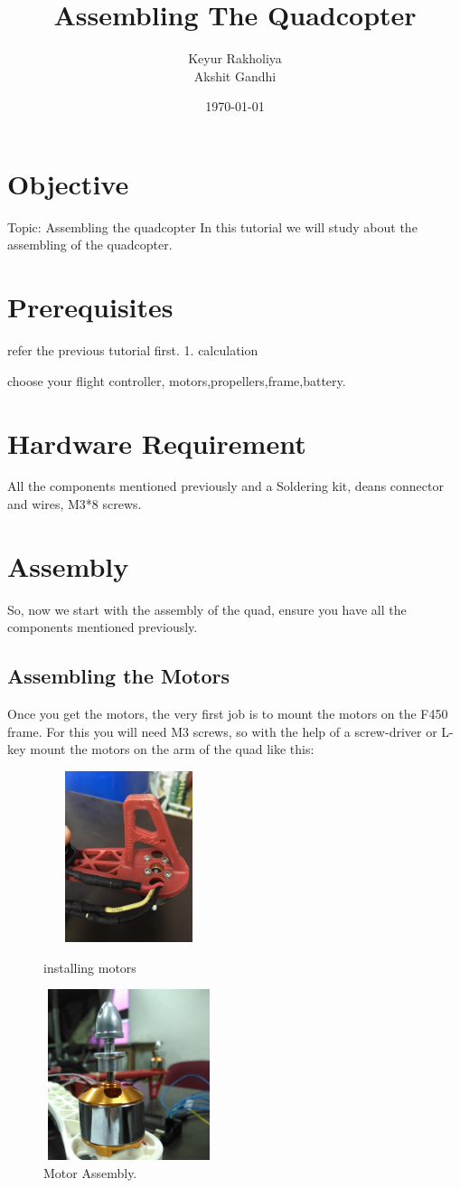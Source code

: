 \documentclass[11pt,a4paper]{article}
\title{Assembling The Quadcopter}
\author{Keyur Rakholiya \\ Akshit Gandhi}
\date{\today}
\begin{document}
	\maketitle
	\newpage
	\tableofcontents
	\newpage
	\section{Objective}
	Topic: Assembling the quadcopter
		In this tutorial we will study about the assembling of the quadcopter.
	\section{Prerequisites}
	refer the previous tutorial first.
	1. calculation
	
	choose your flight controller, motors,propellers,frame,battery.
	\section{Hardware Requirement}
	 All the components mentioned previously and a Soldering kit, deans connector and wires, M3*8 screws.
	\section{Assembly}
	 So, now we start with the assembly of the quad, ensure you have all the components mentioned previously.
	 \subsection{Assembling the Motors}
	 	Once you get the motors, the very first job is to mount the motors on the F450 frame. For this you will need M3 screws, so with the help of a screw-driver or L-key mount the motors on the arm of the quad like this:
	 	\begin{figure}[h]
	 	
	 	\centering
		\includegraphics[width=5cm,height=5cm]{screw}
		\caption{installing motors}
	 	\includegraphics[width=5cm,height=5cm]{mot}
	 	\caption{Motor Assembly.}
\end{figure}
\end{document}
